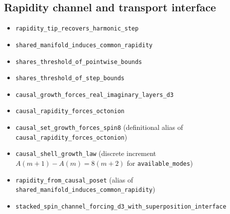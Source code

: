 \documentclass[11pt]{amsart}
\begin{document}
\subsection*{Rapidity channel and transport interface}
\begin{itemize}
\item \texttt{rapidity\_tip\_recovers\_harmonic\_step}
\item \texttt{shared\_manifold\_induces\_common\_rapidity}
\item \texttt{shares\_threshold\_of\_pointwise\_bounds}
\item \texttt{shares\_threshold\_of\_step\_bounds}
\item \texttt{causal\_growth\_forces\_real\_imaginary\_layers\_d3}
\item \texttt{causal\_rapidity\_forces\_octonion}
\item \texttt{causal\_set\_growth\_forces\_spin8} (definitional alias of \texttt{causal\_rapidity\_forces\_octonion})
\item \texttt{causal\_shell\_growth\_law} (discrete increment \(A(m+1)-A(m)=8(m+2)\) for \texttt{available\_modes})
\item \texttt{rapidity\_from\_causal\_poset} (alias of \texttt{shared\_manifold\_induces\_common\_rapidity})
\item \texttt{stacked\_spin\_channel\_forcing\_d3\_with\_superposition\_interface}
\end{itemize}
\end{document}
